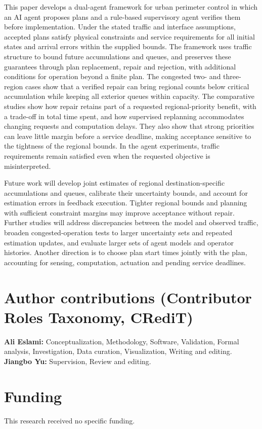 \documentclass[final]{cas-sc}
\theoremstyle{definition}
\theoremstyle{plain}
\theoremstyle{definition}
\theoremstyle{plain}
\begin{document}
This paper develops a dual-agent framework for urban perimeter control
in which an AI agent proposes plans and a rule-based supervisory agent
verifies them before implementation. Under the stated traffic and
interface assumptions, accepted plans satisfy physical constraints and
service requirements for all initial states and arrival errors within
the supplied bounds. The framework uses traffic structure to bound
future accumulations and queues, and preserves these guarantees through
plan replacement, repair and rejection, with additional conditions for
operation beyond a finite plan. The congested two- and three-region
cases show that a verified repair can bring regional counts below critical
accumulation while keeping all exterior queues within capacity. The comparative studies show how
repair retains part of a requested regional-priority benefit, with a
trade-off in total time spent, and how supervised replanning accommodates
changing requests and computation delays. They also show that strong
priorities can leave little margin before a service deadline, making
acceptance sensitive to the tightness of the regional bounds. In the
agent experiments, traffic requirements remain satisfied even when
the requested objective is misinterpreted.

Future work will develop joint estimates of regional destination-specific accumulations
and queues, calibrate their uncertainty bounds, and account for estimation
errors in feedback execution. Tighter regional bounds and planning
with sufficient constraint margins may improve acceptance without
repair. Further studies will address discrepancies between the model
and observed traffic, broaden congested-operation
tests to larger uncertainty sets and repeated estimation updates, and
evaluate larger sets of agent models and operator histories. Another
direction is to choose plan start times jointly with the plan, accounting
for sensing, computation, actuation and pending service deadlines.

\section*{Author contributions (Contributor Roles Taxonomy, CRediT)}
\textbf{Ali Eslami:} Conceptualization, Methodology, Software, Validation,
Formal analysis, Investigation, Data curation, Visualization,
Writing and editing.
\textbf{Jiangbo Yu:} Supervision, Review and editing.

\section*{Funding}
This research received no specific funding.
\end{document}
